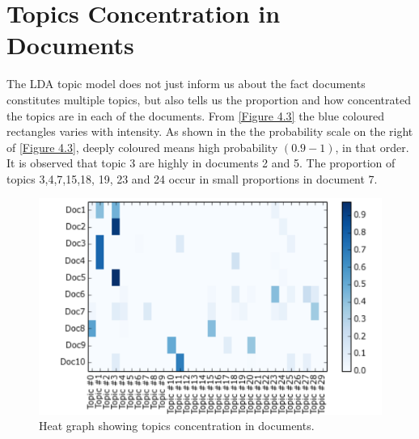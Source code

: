 \section{Topics Concentration in Documents}
The LDA topic model does not just inform us about the fact documents constitutes multiple topics, but also tells us the proportion and how concentrated the topics are in each of the documents. From \eqref{Figure 4.3} the blue coloured rectangles varies with intensity. As shown in the the probability scale on the right of \eqref{Figure 4.3}, deeply coloured means high probability $(0.9-1)$, in that order. It is observed that topic 3 are highly
in documents 2 and 5. The proportion of topics 3,4,7,15,18, 19, 23 and 24 occur in small proportions in document 7.
\begin{figure}[hbtp]
\centering
\includegraphics[scale=0.85]{c4_4.png}
\caption{Heat graph showing topics concentration in documents.}\label{Figure 4.3}
\end{figure}
\newpage
